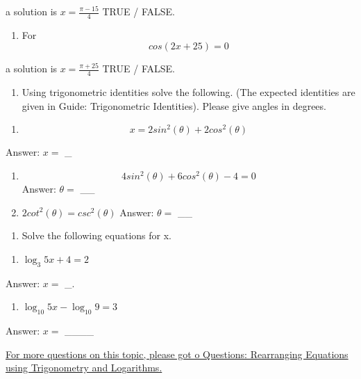 \documentclass[
  12pt,
  a4paper, oneside]{starmastarticle}
\providecommand{\tightlist}{%
  \setlength{\itemsep}{0pt}\setlength{\parskip}{0pt}}\usepackage{longtable,booktabs,array}
\begin{document}
a solution is \(x=\frac{\pi-15}{4}\) TRUE / FALSE.

\begin{enumerate}
\def\labelenumi{\alph{enumi})}
\setcounter{enumi}{2}
\tightlist
\item
  For \[cos(2x+25)= 0\]
\end{enumerate}

a solution is \(x=\frac{\pi+25}{4}\) TRUE / FALSE.

\begin{enumerate}
\def\labelenumi{\arabic{enumi}.}
\setcounter{enumi}{1}
\tightlist
\item
  Using trigonometric identities solve the following. (The expected
  identities are given in Guide: Trigonometric Identities). Please give
  angles in degrees.
\end{enumerate}

\begin{enumerate}
\def\labelenumi{\alph{enumi})}
\tightlist
\item
  \[x = 2sin^2(\theta) + 2cos^2(\theta)\]
\end{enumerate}

Answer: \(x =\) \_

\begin{enumerate}
\def\labelenumi{\alph{enumi})}
\setcounter{enumi}{1}
\item
  \[4sin^2(\theta) + 6cos^2(\theta) - 4 =0\] Answer: \(\theta =\) \_\_
\item
  \(2cot^2(\theta) = csc^2(\theta)\) Answer: \(\theta =\) \_\_
\end{enumerate}

\begin{enumerate}
\def\labelenumi{\arabic{enumi}.}
\setcounter{enumi}{2}
\tightlist
\item
  Solve the following equations for x.
\end{enumerate}

\begin{enumerate}
\def\labelenumi{\alph{enumi})}
\tightlist
\item
  \(\log_{3}{5x+4}=2\)
\end{enumerate}

Answer: \(x =\) \_.

\begin{enumerate}
\def\labelenumi{\alph{enumi})}
\setcounter{enumi}{1}
\tightlist
\item
  \(\log_{10}{5x} - \log_{10}{9} =3\)
\end{enumerate}

Answer: \(x =\) \_\_\_\_

\href{qs-rearrangingwithtrigandlogs.qmd}{For more questions on this
topic, please got o Questions: Rearranging Equations using Trigonometry
and Logarithms.}
\end{document}

